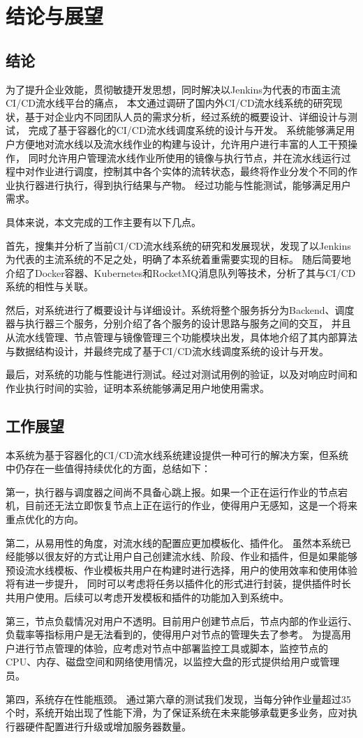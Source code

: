 
\chapter{结论与展望}

\section{结论}

为了提升企业效能，贯彻敏捷开发思想，同时解决以Jenkins为代表的市面主流CI/CD流水线平台的痛点，
本文通过调研了国内外CI/CD流水线系统的研究现状，基于对企业内不同团队人员的需求分析，经过系统的概要设计、详细设计与测试，
完成了基于容器化的CI/CD流水线调度系统的设计与开发。
系统能够满足用户方便地对流水线以及流水线作业的构建与设计，允许用户进行丰富的人工干预操作，
同时允许用户管理流水线作业所使用的镜像与执行节点，并在流水线运行过程中对作业进行调度，控制其中各个实体的流转状态，最终将作业分发个不同的作业执行器进行执行，得到执行结果与产物。
经过功能与性能测试，能够满足用户需求。

具体来说，本文完成的工作主要有以下几点。

首先，搜集并分析了当前CI/CD流水线系统的研究和发展现状，发现了以Jenkins为代表的主流系统的不足之处，明确了本系统着重需要实现的目标。
随后简要地介绍了Docker容器、Kubernetes和RocketMQ消息队列等技术，分析了其与CI/CD系统的相性与关联。

然后，对系统进行了概要设计与详细设计。系统将整个服务拆分为Backend、调度器与执行器三个服务，分别介绍了各个服务的设计思路与服务之间的交互，
并且从流水线管理、节点管理与镜像管理三个功能模块出发，具体地介绍了其内部算法与数据结构设计，并最终完成了基于CI/CD流水线调度系统的设计与开发。

最后，对系统的功能与性能进行测试。经过对测试用例的验证，以及对响应时间和作业执行时间的实验，证明本系统能够满足用户地使用需求。

\section{工作展望}

本系统为基于容器化的CI/CD流水线系统建设提供一种可行的解决方案，但系统中仍存在一些值得持续优化的方面，总结如下：

第一，执行器与调度器之间尚不具备心跳上报。如果一个正在运行作业的节点宕机，目前还无法立即恢复节点上正在运行的作业，使得用户无感知，这是一个将来重点优化的方向。

第二，从易用性的角度，对流水线的配置应更加模板化、插件化。
虽然本系统已经能够以很友好的方式让用户自己创建流水线、阶段、作业和插件，但是如果能够预设流水线模板、作业模板共用户在构建时进行选择，用户的使用效率和使用体验将有进一步提升，
同时可以考虑将任务以插件化的形式进行封装，提供插件时长共用户使用。后续可以考虑开发模板和插件的功能加入到系统中。

第三，节点负载情况对用户不透明。目前用户创建节点后，节点内部的作业运行、负载率等指标用户是无法看到的，使得用户对节点的管理失去了参考。
为提高用户进行节点管理的体验，应考虑对节点中部署监控工具或脚本，监控节点的CPU、内存、磁盘空间和网络使用情况，以监控大盘的形式提供给用户或管理员。

第四，系统存在性能瓶颈。
通过第六章的测试我们发现，当每分钟作业量超过35个时，系统开始出现了性能下滑，为了保证系统在未来能够承载更多业务，应对执行器硬件配置进行升级或增加服务器数量。